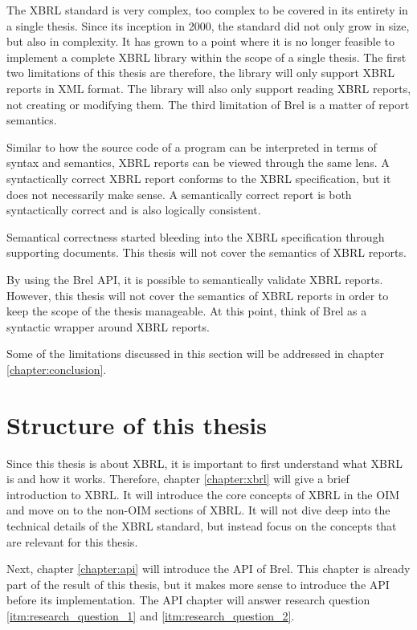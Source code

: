 The XBRL standard is very complex, too complex to be covered in its entirety in a single thesis.
Since its inception in 2000, the standard did not only grow in size, but also in complexity.
It has grown to a point where it is no longer feasible to implement a complete XBRL library within the scope of a single thesis.
The first two limitations of this thesis are therefore, the library will only support XBRL reports in XML format.
The library will also only support reading XBRL reports, not creating or modifying them.
The third limitation of Brel is a matter of report semantics.

Similar to how the source code of a program can be interpreted in terms of syntax and semantics, XBRL reports can be viewed through the same lens.
A syntactically correct XBRL report conforms to the XBRL specification, but it does not necessarily make sense.
A semantically correct report is both syntactically correct and is also logically consistent.

Semantical correctness started bleeding into the XBRL specification through supporting documents.
This thesis will not cover the semantics of XBRL reports.

By using the Brel API, it is possible to semantically validate XBRL reports.
However, this thesis will not cover the semantics of XBRL reports in order to keep the scope of the thesis manageable.
At this point, think of Brel as a syntactic wrapper around XBRL reports.

Some of the limitations discussed in this section will be addressed in chapter \ref{chapter:conclusion}.

\section{Structure of this thesis}

Since this thesis is about XBRL, it is important to first understand what XBRL is and how it works.
Therefore, chapter \ref{chapter:xbrl} will give a brief introduction to XBRL. 
It will introduce the core concepts of XBRL in the OIM and move on to the non-OIM sections of XBRL.
It will not dive deep into the technical details of the XBRL standard, but instead focus on the concepts that are relevant for this thesis.

Next, chapter \ref{chapter:api} will introduce the API of Brel.
This chapter is already part of the result of this thesis, but it makes more sense to introduce the API before its implementation.
The API chapter will answer research question \ref{itm:research_question_1} and \ref{itm:research_question_2}.

